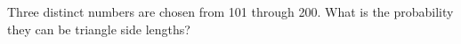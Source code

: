 Three distinct numbers are chosen from 101 through 200. What is the probability they can be triangle side lengths?
